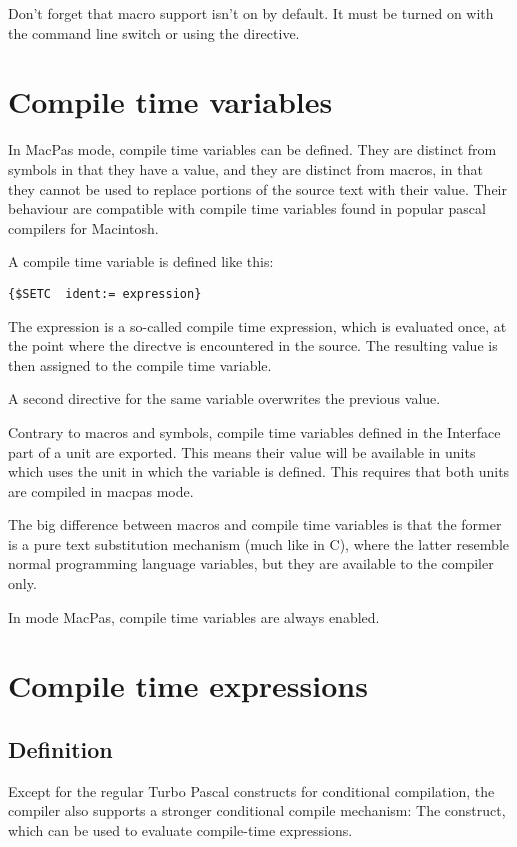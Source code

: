 \begin{remark}Don't forget that macro support isn't on by default. It must
be turned on  with the  command line switch or using the
 directive.
\end{remark}


\section{Compile time variables}
In MacPas mode, compile time variables can be defined. They are distinct
from symbols in that they have a value, and they are distinct from macros,
in that they cannot be used to replace portions of the source text with
their value. Their behaviour are compatible with compile time variables 
found in popular pascal compilers for Macintosh. 

A compile time variable is defined like this:
\begin{verbatim}
{$SETC  ident:= expression}
\end{verbatim}
The expression is a so-called compile time expression, which is evaluated once, 
at the point where the  directve is encountered in the
source. The resulting value is then assigned to the compile time variable.

A second  directive for the same variable overwrites the previous value.

Contrary to macros and symbols, compile time variables defined in the 
Interface part of a unit are exported. This means their value will be 
available in units which uses the unit in which the variable is defined. 
This requires that both units are compiled in macpas mode.

The big difference between macros and compile time variables is that the
former is a pure text substitution mechanism (much like in C), where the
latter resemble normal programming language variables, but they are
available to the compiler only. 

In mode MacPas, compile time variables are always enabled.

\section{Compile time expressions}
\subsection{Definition}
Except for the regular Turbo Pascal constructs for conditional compilation,
the \fpc compiler also supports a stronger conditional compile mechanism: 
The  construct, which can be used to evaluate compile-time
expressions.


